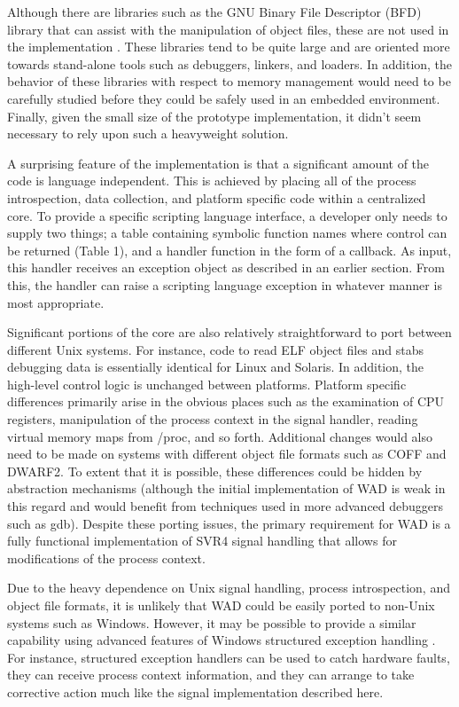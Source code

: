 Although there are libraries such as the GNU Binary File Descriptor
(BFD) library that can assist with the manipulation of object files,
these are not used in the implementation \cite{bfd}.  These
libraries tend to be quite large and are oriented more towards
stand-alone tools such as debuggers, linkers, and loaders.  In addition,
the behavior of these libraries with respect to memory management
would need to be carefully studied before they could be safely used in
an embedded environment. Finally, given the small size of the prototype 
implementation, it didn't seem necessary to rely upon such a 
heavyweight solution.

A surprising feature of the implementation is that a significant
amount of the code is language independent.  This is achieved by
placing all of the process introspection, data collection, and
platform specific code within a centralized core.  To provide a
specific scripting language interface, a developer only needs to
supply two things; a table containing symbolic function names where
control can be returned (Table 1), and a handler function in the form
of a callback.  As input, this handler receives an exception object as
described in an earlier section.  From this, the handler can
raise a scripting language exception in whatever manner is most
appropriate.

Significant portions of the core are also relatively straightforward
to port between different Unix systems.  For instance, code to read
ELF object files and stabs debugging data is essentially identical for
Linux and Solaris.  In addition, the high-level control logic is
unchanged between platforms.  Platform specific differences primarily
arise in the obvious places such as the examination of CPU
registers, manipulation of the process context in the signal handler,
reading virtual memory maps from /proc, and so forth.  Additional
changes would also need to be made on systems with different object
file formats such as COFF and DWARF2.  To extent that it is possible,
these differences could be hidden by abstraction mechanisms (although
the initial implementation of WAD is weak in this regard and would
benefit from techniques used in more advanced debuggers such as gdb).
Despite these porting issues, the primary requirement for WAD is a fully
functional implementation of SVR4 signal handling that allows for
modifications of the process context.

Due to the heavy dependence on Unix signal handling, process
introspection, and object file formats, it is unlikely that WAD could
be easily ported to non-Unix systems such as Windows.  However, it may
be possible to provide a similar capability using advanced features of
Windows structured exception handling \cite{seh}.  For instance, structured
exception handlers can be used to catch hardware faults, they can
receive process context information, and they can arrange to take
corrective action much like the signal implementation described here.  

